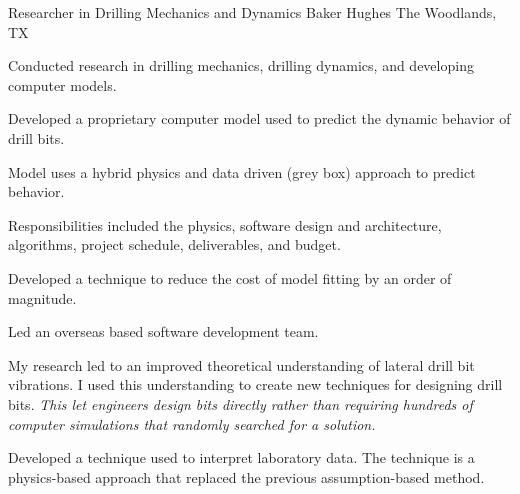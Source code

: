 \documentclass{leresume}
\begin{document}
            {Researcher in Drilling Mechanics and Dynamics}
            {Baker Hughes}
			{The Woodlands, TX}
			
			Conducted research in drilling mechanics, drilling dynamics, and developing computer models.
		
		\begin{bulletedlist}
			
		\item
		
				Developed a proprietary computer model used to predict the dynamic behavior of drill bits.
				
		\begin{bulletedlist}
			
		\item
		
						Model uses a hybrid physics and data driven (grey box) approach to predict behavior.
					
		\item
		
						Responsibilities included the physics, software design and architecture, algorithms, project schedule, deliverables, and budget.
					
		\item
		
						Developed a technique to reduce the cost of model fitting by an order of magnitude.
					
		\item
		Led an overseas based software development team.
		\end{bulletedlist}
	
		\item
		
				My research led to an improved theoretical understanding of lateral drill bit vibrations.  I used this understanding to create new techniques for
				designing drill bits. 
		\textit{This let engineers design bits directly rather than requiring hundreds of computer simulations that randomly searched for a solution.}
	
		\item
		Developed a technique used to interpret laboratory data.  The technique is a physics-based approach that replaced the previous assumption-based method.
		\end{bulletedlist}
	
		
		
\end{document}
